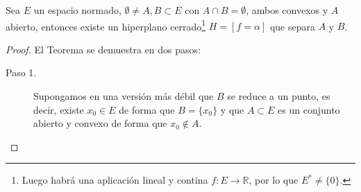 \begin{teo}
    Sea $E$ un espacio normado, $\emptyset \neq A,B\subset E$ con $A\cap B = \emptyset $, ambos convexos y $A$ abierto, entonces existe un hiperplano cerrado\footnote{Luego habrá una aplicación lineal y contina $f:E\to \mathbb{R}$, por lo que $E^\ast \neq \{0\}$.} $H = [f=\alpha]$ que separa $A$ y $B$.
    \begin{proof}
        El Teorema se demuestra en dos pasos:
        \begin{description}
            \item [Paso 1.] Supongamos en una versión más débil que $B$ se reduce a un punto, es decir, existe $x_0\in E$ de forma que $B = \{x_0\}$ y que $A\subset E$ es un conjunto abierto y convexo de forma que $x_0 \notin A$.


\end{description}
\end{proof}
\end{teo}

